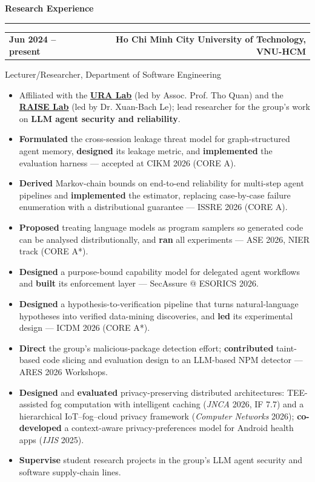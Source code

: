 \documentclass[11pt,a4paper]{article}
\makeatletter
\newcommand{\sectiontitle}[1]{%
  \Needspace{5\baselineskip}
  \vspace{0.28cm}%
  {\Large\bfseries #1}\par\vspace{0.08cm}\hrule\vspace{0.18cm}%
}
\newcommand{\headerline}[2]{%
  \noindent\begin{tabular*}{\textwidth}{@{}l@{\extracolsep{\fill}}r@{}}
  #1 & #2
  \end{tabular*}\par
}
\newcommand{\entry}[4]{%
  \vspace{0.16cm}
  \headerline{\textbf{#1}}{\textbf{#2}}
  {#3}\par
  #4
}
\makeatother
\begin{document}
\sectiontitle{Research Experience}
\entry{Jun 2024 -- present}{Ho Chi Minh City University of Technology, VNU-HCM}
{Lecturer/Researcher, Department of Software Engineering}
{\begin{itemize}
  \item Affiliated with the \href{https://ura.hcmut.edu.vn/}{\textbf{URA Lab}} (led by Assoc. Prof. Tho Quan) and the \href{https://raise-website.vercel.app/}{\textbf{RAISE Lab}} (led by Dr. Xuan-Bach Le); lead researcher for the group's work on \textbf{LLM agent security and reliability}.
  \item \textbf{Formulated} the cross-session leakage threat model for graph-structured agent memory, \textbf{designed} its leakage metric, and \textbf{implemented} the evaluation harness --- accepted at CIKM 2026 (CORE A).
  \item \textbf{Derived} Markov-chain bounds on end-to-end reliability for multi-step agent pipelines and \textbf{implemented} the estimator, replacing case-by-case failure enumeration with a distributional guarantee --- ISSRE 2026 (CORE A).
  \item \textbf{Proposed} treating language models as program samplers so generated code can be analysed distributionally, and \textbf{ran} all experiments --- ASE 2026, NIER track (CORE A*).
  \item \textbf{Designed} a purpose-bound capability model for delegated agent workflows and \textbf{built} its enforcement layer --- SecAssure @ ESORICS 2026.
  \item \textbf{Designed} a hypothesis-to-verification pipeline that turns natural-language hypotheses into verified data-mining discoveries, and \textbf{led} its experimental design --- ICDM 2026 (CORE A*).
  \item \textbf{Direct} the group's malicious-package detection effort; \textbf{contributed} taint-based code slicing and evaluation design to an LLM-based NPM detector --- ARES 2026 Workshops.
  \item \textbf{Designed} and \textbf{evaluated} privacy-preserving distributed architectures: TEE-assisted fog computation with intelligent caching (\textit{JNCA} 2026, IF 7.7) and a hierarchical IoT--fog--cloud privacy framework (\textit{Computer Networks} 2026); \textbf{co-developed} a context-aware privacy-preferences model for Android health apps (\textit{IJIS} 2025).
  \item \textbf{Supervise} student research projects in the group's LLM agent security and software supply-chain lines.
\end{itemize}}
\end{document}
